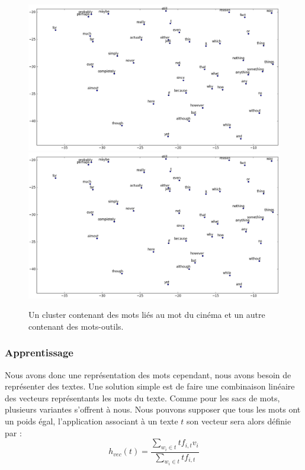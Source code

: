 \documentclass{article}
\begin{document}
\begin{figure}[h]
\begin{center}
\includegraphics[scale=0.35]{images/cluster_cinema.png} \\
\includegraphics[scale=0.35]{images/cluster_toolwords.png}
\caption{Un cluster contenant des mots liés au mot du cinéma et un autre contenant des mots-outils.}
\label{clusters}
\end{center}
\end{figure}

\subsubsection{Apprentissage}

Nous avons donc une représentation des mots cependant, nous avons besoin de représenter des textes. Une solution simple est de faire une combinaison linéaire des vecteurs représentants les mots du texte. Comme pour les sacs de mots, plusieurs variantes s'offrent à nous. Nous pouvons supposer que tous les mots ont un poids égal, l'application associant à un texte $t$ son vecteur sera alors définie par :
$$
h_{vec}(t) = \frac{\sum_{w_{i} \in t}{tf_{i, t}v_{i}}}{\sum_{w_{i} \in t}{tf_{i, t}}} 
$$
\end{document}
